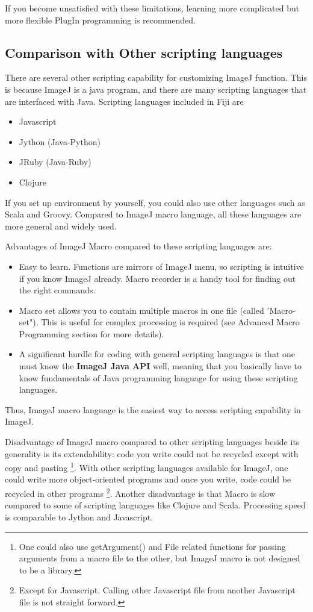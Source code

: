 \documentclass[11pt,a4paper,oneside]{report}
\begin{document}
If you become unsatisfied with these limitations, 
learning more complicated but more flexible PlugIn programming is recommended. 

\subsection{Comparison with Other scripting languages}
There are several other scripting capability for customizing ImageJ function. 
This is because ImageJ is a java program, 
and there are many scripting languages that are interfaced with Java. 
Scripting languages included in Fiji are 

\begin{itemize}
 \item Javascript
 \item Jython (Java-Python)
 \item JRuby (Java-Ruby)
 \item Clojure
 \end{itemize}

If you set up environment by yourself, you could also use other languages such as Scala and Groovy. 
Compared to ImageJ macro language, all these languages are more general and widely used. 

Advantages of ImageJ Macro compared to these scripting languages are: 
\begin{itemize}
\item Easy to learn. 
Functions are mirrors of ImageJ menu, so scripting is intuitive if you know ImageJ already. 
Macro recorder is a handy tool for finding out the right commands. 

\item Macro set allows you to contain multiple macros in one file (called 'Macro-set"). 
This is useful for complex processing is required (see Advanced Macro Programming section for more details). 

\item A significant hurdle for coding with general scripting languages is that one must know the 
\textbf{ImageJ Java API} well, meaning that you basically have to know 
fundamentals of Java programming language 
for using these scripting languages. 
\end{itemize}

Thus, ImageJ macro language is the easiest way to access scripting capability in ImageJ. 

Disadvantage of ImageJ macro compared to other scripting languages 
beside its generality is its extendability: 
code you write could not be recycled except with copy and pasting
\footnote{One could also use getArgument() and File related functions for passing arguments 
from a macro file to the other, but ImageJ macro is not designed to be a library. }. 
With other scripting languages available for ImageJ, one could write more object-oriented programs 
and once you write, code could be recycled in other programs
\footnote{ Except for Javascript. Calling other Javascript 
file from another Javascript file is not straight forward.}. 
Another disadvantage is that Macro is slow compared to some of scripting languages like Clojure and Scala. 
Processing speed is comparable to Jython and Javascript.  
\end{document}
